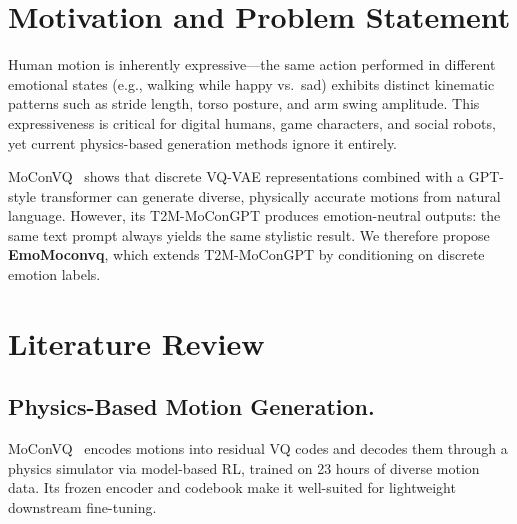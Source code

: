 \documentclass[conference]{IEEEtran}
\begin{document}
\begin{abstract}
Physics-based motion generation methods such as MoConVQ~\cite{yao2023moconvq}
produce high-quality motions from text descriptions but generate stylistically neutral
results regardless of emotional context. We propose \textbf{EmoMoconvq}, which extends
MoConVQ's T2M-MoConGPT by injecting a discrete emotion label
(e.g., \textit{happy}, \textit{sad}, \textit{angry}, \textit{fearful}) as an
additional conditioning signal. Through parameter-efficient fine-tuning on a small
emotionally annotated motion dataset, we aim to generate physically plausible motions
whose stylistic qualities reflect the intended emotional state.
\end{abstract}

\IEEEpeerreviewmaketitle

\section{Motivation and Problem Statement}
Human motion is inherently expressive---the same action performed in different emotional
states (e.g., walking while happy vs.\ sad) exhibits distinct kinematic patterns such
as stride length, torso posture, and arm swing amplitude. This expressiveness is critical
for digital humans, game characters, and social robots, yet current physics-based
generation methods ignore it entirely.

MoConVQ~\cite{yao2023moconvq} shows that discrete VQ-VAE representations combined
with a GPT-style transformer can generate diverse, physically accurate motions from
natural language. However, its T2M-MoConGPT produces emotion-neutral outputs: the same
text prompt always yields the same stylistic result. We therefore propose \textbf{EmoMoconvq},
which extends T2M-MoConGPT by conditioning on discrete emotion labels. 

\section{Literature Review}

\subsection{Physics-Based Motion Generation.}
MoConVQ~\cite{yao2023moconvq} encodes motions into residual VQ codes and decodes
them through a physics simulator via model-based RL, trained on 23 hours of diverse
motion data. Its frozen encoder and codebook make it well-suited for lightweight
downstream fine-tuning.
\end{document}
